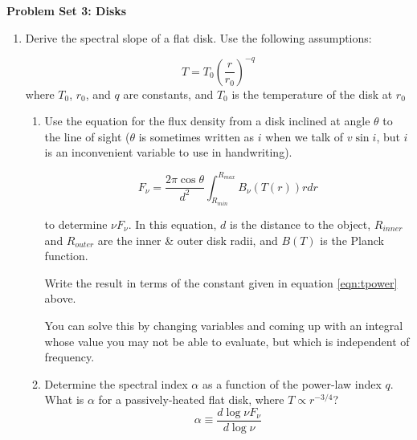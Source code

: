\documentclass[twoside]{tufte-book} %
\begin{document}
\noindent\textbf{Problem Set 3: Disks}








\begin{enumerate}
\item
    Derive the spectral slope of a flat disk.  Use the following assumptions:

    \begin{equation}
        \label{eqn:tpower}
        T = T_0 \left(\frac{r}{r_0}\right)^{-q}
    \end{equation}
    where $T_0$, $r_0$, and $q$ are constants, and $T_0$ is the temperature of the disk at $r_0$

    \begin{enumerate}
        \item Use the equation for the flux density from a disk inclined at
            angle $\theta$ to the line of sight ($\theta$ is sometimes written
            as $i$ when we talk of $v \sin i$, but $i$ is an inconvenient
            variable to use in handwriting).

            \begin{equation}
                F_\nu = \frac{2 \pi \cos\theta}{d^2} \int_{R_{min}}^{R_{max}} B_\nu(T(r)) r dr
            \end{equation}

            to determine $\nu F_\nu$.  In this equation, $d$ is the distance to
            the object, $R_{inner}$ and $R_{outer}$ are the inner \& outer disk
            radii, and $B(T)$ is the Planck function.  

            Write the result in terms of the constant given in equation \ref{eqn:tpower} above.

            You can solve this by changing variables and coming up with an
            integral whose value you may not be able to evaluate, but which is
            independent of frequency.

        \item Determine the spectral index $\alpha$ as a function of the power-law index $q$.
            What is $\alpha$ for a passively-heated flat disk, where $T\propto r^{-3/4}$?
            \begin{equation}
                \alpha \equiv \frac{d \log {\nu F_\nu}}{d \log \nu}
            \end{equation}


\end{enumerate}
\end{enumerate}
\end{document}

